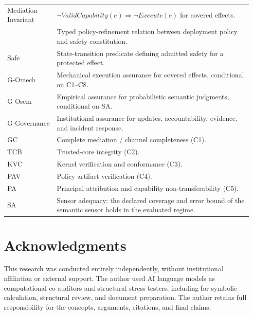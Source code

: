 \documentclass[11pt]{article}
\def\ensuremath#1{#1}%
\def\mathrm#1{#1}%
\def\mathsf#1{#1}%
\def\textsuperscript#1{#1}%
\newcommand{\Gmech}{G-O\textsuperscript{mech}}
\newcommand{\Gsem}{G-O\textsuperscript{sem}}
\newcommand{\Safe}{\ensuremath{\mathsf{Safe}}}
\newcommand{\PRef}{\ensuremath{\sqsubseteq}}
\begin{document}
\begin{longtable}{@{}L{3.2cm} L{11.8cm}@{}}
Mediation Invariant & \(\neg\mathrm{ValidCapability}(e)\Rightarrow\neg\mathrm{Execute}(e)\) for covered effects. \\
\PRef{} & Typed policy-refinement relation between deployment policy and safety constitution. \\
\Safe{} & State-transition predicate defining admitted safety for a protected effect. \\
\Gmech{} & Mechanical execution assurance for covered effects, conditional on C1--C8. \\
\Gsem{} & Empirical assurance for probabilistic semantic judgments, conditional on SA. \\
G-Governance & Institutional assurance for updates, accountability, evidence, and incident response. \\
GC & Complete mediation / channel completeness (C1). \\
TCB & Trusted-core integrity (C2). \\
KVC & Kernel verification and conformance (C3). \\
PAV & Policy-artifact verification (C4). \\
PA & Principal attribution and capability non-transferability (C5). \\
SA & Sensor adequacy: the declared coverage and error bound of the semantic sensor holds in the evaluated regime. \\
\end{longtable}

\section*{Acknowledgments}

This research was conducted entirely independently, without institutional affiliation or external support. The author used AI language models as computational co-auditors and structural stress-testers, including for symbolic calculation, structural review, and document preparation. The author retains full responsibility for the concepts, arguments, citations, and final claims.
\end{document}
